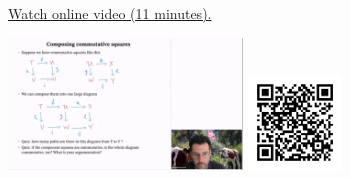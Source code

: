 
\begin{minipage}{10cm}
    \href{https://act4e-spring21.netlify.app/videos/spring2021-nat-trafos:diagrams.html}{Watch online video (11 minutes).}
        
    \href{https://act4e-spring21.netlify.app/videos/spring2021-nat-trafos:diagrams.html}{\includegraphics[height=3.5cm]{spring2021-nat-trafos:diagrams/thumbnails.jpg}}
    \href{https://act4e-spring21.netlify.app/videos/spring2021-nat-trafos:diagrams.html}{\includegraphics[height=2.5cm]{spring2021-nat-trafos:diagrams/qrcode.png}}
\end{minipage}
